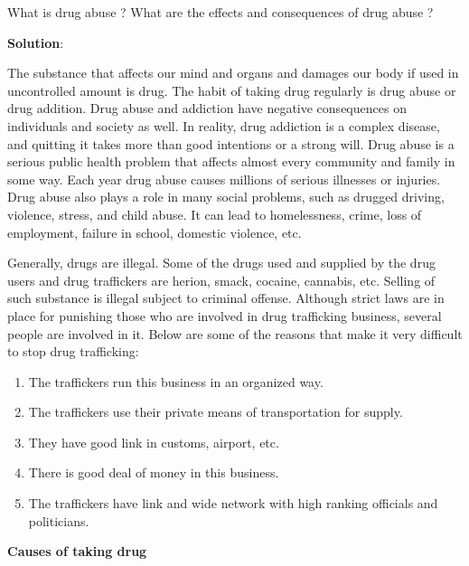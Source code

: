 \documentclass[
]{book}
\newcommand{\question}{\item}
\newenvironment{solution}{ {\bfseries Solution}:}{}
\begin{document}
\begin{questions}
\question What is drug abuse ? What are the effects and consequences of drug abuse ?

\begin{solution}

The substance that affects our mind and organs and damages our body if used in uncontrolled amount is drug. The habit of taking drug regularly is drug abuse or drug addition. Drug abuse and addiction have negative consequences on individuals and society as well. In reality, drug addiction is a complex disease, and quitting it takes more than good intentions or a strong will. Drug abuse is a serious public health problem that affects almost every community and family in some way. Each year drug abuse causes millions of serious illnesses or injuries. Drug abuse also plays a role in many social problems, such as drugged driving, violence, stress, and child abuse. It can lead to homelessness, crime, loss of employment, failure in school, domestic violence, etc.

Generally, drugs are illegal. Some of the drugs used and supplied by the drug users and drug traffickers are herion, smack, cocaine, cannabis, etc. Selling of such substance is illegal subject to criminal offense. Although strict laws are in place for punishing those who are involved in drug trafficking business, several people are involved in it. Below are some of the reasons that make it very difficult to stop drug trafficking:

\begin{enumerate}
\item The traffickers run this business in an organized way.
\item The traffickers use their private means of transportation for supply.
\item They have good link in customs, airport, etc.
\item There is good deal of money in this business.
\item The traffickers have link and wide network with high ranking officials and politicians.
\end{enumerate}

\textbf{Causes of taking drug}


\end{solution}
\end{questions}
\end{document}
